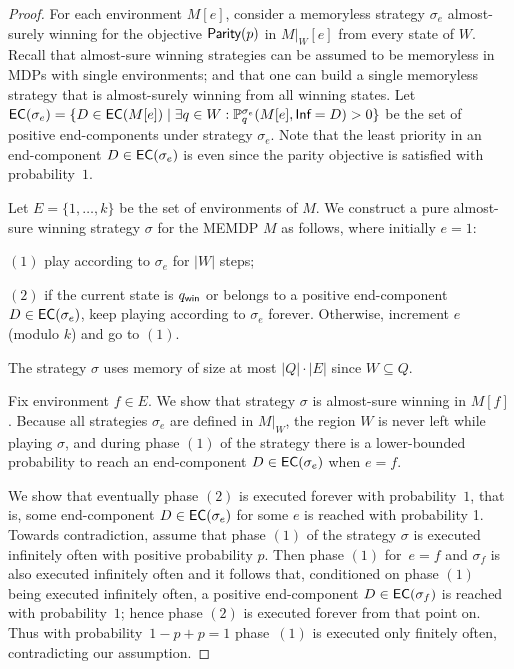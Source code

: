 \documentclass[a4paper,USenglish,cleveref, autoref, thm-restate]{lipics-v2021}
\def\abs#1{\ensuremath{\lvert #1 \rvert}}
\newcommand*{\pr}{\mathbb{P}}
\newcommand\restr[2]{\ensuremath{\left.#1\right\rvert_{#2}}}
\newcommand\Parity{\textrm{\sf Parity}}
\newcommand\ecs{\textrm{\sf EC}}
\newcommand\Inf{\textrm{\sf Inf}}
\def\winabsorb{q_{\sf win}}
\begin{document}
\begin{proof}
	For each environment $M[e]$, consider a memoryless strategy $\sigma_e$
	almost-surely winning for the objective $\Parity(p)$ in $\restr{M}{W}[e]$ from every state of $W$.
	Recall that almost-sure winning strategies can be assumed to be memoryless
	in MDPs with single environments; and that one can build a single memoryless strategy that is almost-surely winning
	from all winning states.
	Let $\ecs(\sigma_e) = \{ D \in \ecs(M[e]) \mid \exists q \in W: \pr_{q}^{\sigma_e}(M[e], \Inf = D) > 0 \}$ 
	be the set of positive end-components under strategy $\sigma_e$.
	Note that the least priority in an end-component $D \in \ecs(\sigma_e)$ is even
	since the parity objective is satisfied with probability~$1$.

	Let $E = \{1,\dots,k\}$ be the set of environments of $M$. 
	We construct a pure almost-sure winning strategy $\sigma$ for the MEMDP $M$ as follows,
	where initially $e=1$:

	$(1)$ play according to $\sigma_e$ for $\abs{W}$ steps;

	$(2)$ if the current state is $\winabsorb$ or belongs to a positive end-component
	$D \in  \ecs(\sigma_e)$, keep playing according to $\sigma_e$ forever.
	Otherwise, increment $e$ (modulo $k$) and go to $(1)$.
	\smallskip

The strategy $\sigma$ uses memory of size at most  $\abs{Q}\cdot\abs{E}$ since $W \subseteq Q$. 

	Fix environment $f \in E$. We show that strategy 
	$\sigma$ is almost-sure winning in $M[f]$. Because all strategies $\sigma_e$ are defined in $\restr{M}{W}$,
	the region $W$
	is never left while playing $\sigma$, and during phase $(1)$ of the strategy
	there is a lower-bounded probability to reach an end-component $D \in  \ecs(\sigma_e)$ 
	when $e=f$.

	We show that eventually phase $(2)$ is executed forever with probability~$1$,
	that is, some end-component $D \in  \ecs(\sigma_e)$ for some $e$ is reached with probability 1.
	Towards contradiction,
	assume that phase $(1)$ of the strategy $\sigma$ is executed infinitely often with positive probability $p$.
	Then phase $(1)$ for~$e=f$ and $\sigma_f$ is also executed infinitely often and
	it follows that, conditioned on phase $(1)$ being executed infinitely often, 
	a positive end-component $D \in  \ecs(\sigma_f)$ is reached with 
	probability~$1$; 
	hence phase $(2)$ is executed forever from that point on. 
	Thus with probability~$1-p + p = 1$ phase~$(1)$ is executed
	only finitely often, contradicting our assumption.  


\end{proof}
\end{document}
